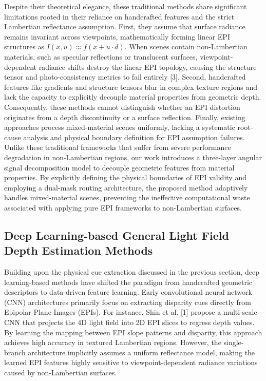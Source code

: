 Despite their theoretical elegance, these traditional methods share significant limitations rooted in their reliance on handcrafted features and the strict Lambertian reflectance assumption. First, they assume that surface radiance remains invariant across viewpoints, mathematically forming linear EPI structures as $I(x, u) \approx f(x + u \cdot d)$. When scenes contain non-Lambertian materials, such as specular reflections or translucent surfaces, viewpoint-dependent radiance shifts destroy the linear EPI topology, causing the structure tensor and photo-consistency metrics to fail entirely [3]. Second, handcrafted features like gradients and structure tensors blur in complex texture regions and lack the capacity to explicitly decouple material properties from geometric depth. Consequently, these methods cannot distinguish whether an EPI distortion originates from a depth discontinuity or a surface reflection. Finally, existing approaches process mixed-material scenes uniformly, lacking a systematic root-cause analysis and physical boundary definition for EPI assumption failures. Unlike these traditional frameworks that suffer from severe performance degradation in non-Lambertian regions, our work introduces a three-layer angular signal decomposition model to decouple geometric features from material properties. By explicitly defining the physical boundaries of EPI validity and employing a dual-mask routing architecture, the proposed method adaptively handles mixed-material scenes, preventing the ineffective computational waste associated with applying pure EPI frameworks to non-Lambertian surfaces.

\subsection{Deep Learning-based General Light Field Depth Estimation Methods}

Building upon the physical cue extraction discussed in the previous section, deep learning-based methods have shifted the paradigm from handcrafted geometric descriptors to data-driven feature learning. Early convolutional neural network (CNN) architectures primarily focus on extracting disparity cues directly from Epipolar Plane Images (EPIs). For instance, Shin et al. [1] propose a multi-scale CNN that projects the 4D light field into 2D EPI slices to regress depth values. By learning the mapping between EPI slope patterns and disparity, this approach achieves high accuracy in textured Lambertian regions. However, the single-branch architecture implicitly assumes a uniform reflectance model, making the learned EPI features highly sensitive to viewpoint-dependent radiance variations caused by non-Lambertian surfaces.

